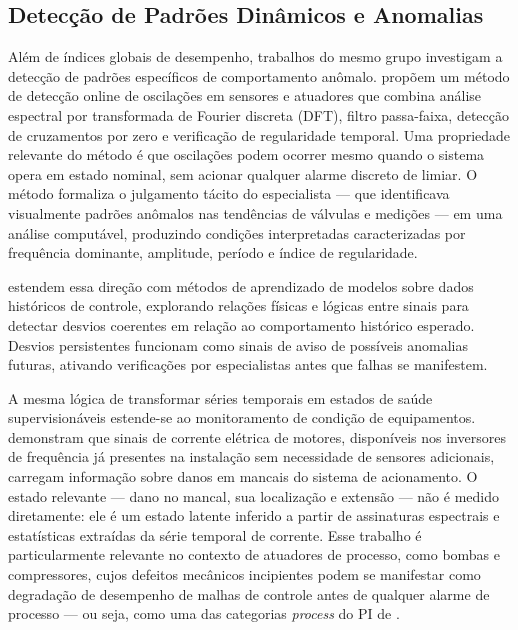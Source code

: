 \subsection{Detecção de Padrões Dinâmicos e Anomalias}

Além de índices globais de desempenho, trabalhos do mesmo grupo investigam a detecção de padrões específicos de comportamento anômalo.  propõem um método de detecção online de oscilações em sensores e atuadores que combina análise espectral por transformada de Fourier discreta (DFT), filtro passa-faixa, detecção de cruzamentos por zero e verificação de regularidade temporal. Uma propriedade relevante do método é que oscilações podem ocorrer mesmo quando o sistema opera em estado nominal, sem acionar qualquer alarme discreto de limiar. O método formaliza o julgamento tácito do especialista --- que identificava visualmente padrões anômalos nas tendências de válvulas e medições --- em uma análise computável, produzindo condições interpretadas caracterizadas por frequência dominante, amplitude, período e índice de regularidade.

 estendem essa direção com métodos de aprendizado de modelos sobre dados históricos de controle, explorando relações físicas e lógicas entre sinais para detectar desvios coerentes em relação ao comportamento histórico esperado. Desvios persistentes funcionam como sinais de aviso de possíveis anomalias futuras, ativando verificações por especialistas antes que falhas se manifestem.

A mesma lógica de transformar séries temporais em estados de saúde supervisionáveis estende-se ao monitoramento de condição de equipamentos.  demonstram que sinais de corrente elétrica de motores, disponíveis nos inversores de frequência já presentes na instalação sem necessidade de sensores adicionais, carregam informação sobre danos em mancais do sistema de acionamento. O estado relevante --- dano no mancal, sua localização e extensão --- não é medido diretamente: ele é um estado latente inferido a partir de assinaturas espectrais e estatísticas extraídas da série temporal de corrente. Esse trabalho é particularmente relevante no contexto de atuadores de processo, como bombas e compressores, cujos defeitos mecânicos incipientes podem se manifestar como degradação de desempenho de malhas de controle antes de qualquer alarme de processo --- ou seja, como uma das categorias \textit{process} do PI de .


